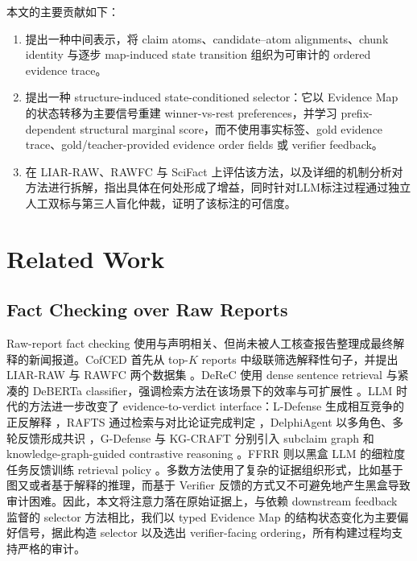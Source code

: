 \documentclass[letterpaper]{article}
\begin{document}
本文的主要贡献如下：

\begin{enumerate}
\item 提出一种中间表示，将 claim atoms、candidate--atom alignments、chunk identity 与逐步 map-induced state transition 组织为可审计的 ordered evidence trace。
\item 提出一种 structure-induced state-conditioned selector：它以 Evidence Map 的状态转移为主要信号重建 winner-vs-rest preferences，并学习 prefix-dependent structural marginal score，而不使用事实标签、gold evidence trace、gold/teacher-provided evidence order fields 或 verifier feedback。
\item 在 LIAR-RAW、RAWFC 与 SciFact 上评估该方法，以及详细的机制分析对方法进行拆解，指出具体在何处形成了增益，同时针对LLM标注过程通过独立人工双标与第三人盲化仲裁，证明了该标注的可信度。
\end{enumerate}

\section{Related Work}

\subsection{Fact Checking over Raw Reports}

Raw-report fact checking 使用与声明相关、但尚未被人工核查报告整理成最终解释的新闻报道。CofCED 首先从 top-$K$ reports 中级联筛选解释性句子，并提出 LIAR-RAW 与 RAWFC 两个数据集 \citep{Yang2022CofCED}。DeReC 使用 dense sentence retrieval 与紧凑的 DeBERTa classifier，强调检索方法在该场景下的效率与可扩展性 \citep{Qazi2025DeReC}。LLM 时代的方法进一步改变了 evidence-to-verdict interface：L-Defense 生成相互竞争的正反解释 \citep{Wang2024LDefense}，RAFTS 通过检索与对比论证完成判定 \citep{Yue2024RAFTS}，DelphiAgent 以多角色、多轮反馈形成共识 \citep{Xiong2025DelphiAgent}，G-Defense 与 KG-CRAFT 分别引入 subclaim graph 和 knowledge-graph-guided contrastive reasoning \citep{Wang2026GDefense,Lourenco2026KGCRAFT}。FFRR 则以黑盒 LLM 的细粒度任务反馈训练 retrieval policy \citep{Zhang2024FFRR}。多数方法使用了复杂的证据组织形式，比如基于图又或者基于解释的推理，而基于 Verifier 反馈的方式又不可避免地产生黑盒导致审计困难。因此，本文将注意力落在原始证据上，与依赖 downstream feedback 监督的 selector 方法相比，我们以 typed Evidence Map 的结构状态变化为主要偏好信号，据此构造 selector 以及选出 verifier-facing ordering，所有构建过程均支持严格的审计。
\end{document}
